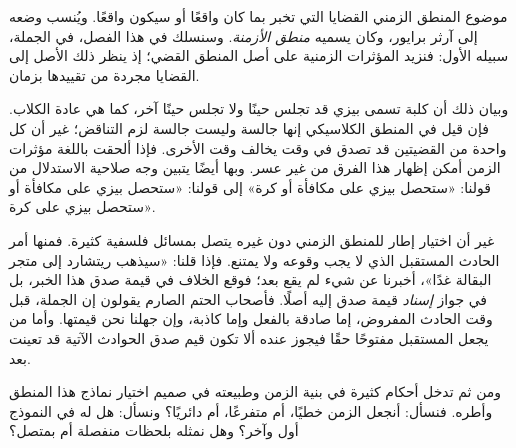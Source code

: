 \documentclass[../../../include/open-logic-section]{subfiles}
\begin{document}


موضوع المنطق الزمني القضايا التي تخبر بما كان واقعًا أو سيكون واقعًا. ويُنسب
وضعه إلى آرثر برايور، وكان يسميه \emph{منطق الأزمنة}. وسنسلك في هذا الفصل،
في الجملة، سبيله الأول: فنزيد المؤثرات الزمنية على أصل المنطق القضي؛ إذ
ينظر ذلك الأصل إلى القضايا مجردة من تقييدها بزمان.

وبيان ذلك أن كلبة تسمى بيزي قد تجلس حينًا ولا تجلس حينًا آخر، كما هي عادة
الكلاب. فإن قيل في المنطق الكلاسيكي إنها جالسة وليست جالسة لزم التناقض؛
غير أن كل واحدة من القضيتين قد تصدق في وقت يخالف وقت الأخرى. فإذا ألحقت
باللغة مؤثرات الزمن أمكن إظهار هذا الفرق من غير عسر. وبها أيضًا يتبين وجه
صلاحية الاستدلال من قولنا: «ستحصل بيزي على مكافأة أو كرة» إلى قولنا:
«ستحصل بيزي على مكافأة أو ستحصل بيزي على كرة».

غير أن اختيار إطار للمنطق الزمني دون غيره يتصل بمسائل فلسفية كثيرة. فمنها
أمر الحادث المستقبل الذي لا يجب وقوعه ولا يمتنع. فإذا قلنا: «سيذهب ريتشارد
إلى متجر البقالة غدًا»، أخبرنا عن شيء لم يقع بعد؛ فوقع الخلاف في قيمة صدق
هذا الخبر، بل في جواز \emph{إسناد} قيمة صدق إليه أصلًا. فأصحاب الحتم الصارم
يقولون إن الجملة، قبل وقت الحادث المفروض، إما صادقة بالفعل وإما كاذبة، وإن
جهلنا نحن قيمتها. وأما من يجعل المستقبل مفتوحًا حقًا فيجوز عنده ألا تكون
قيم صدق الحوادث الآتية قد تعينت بعد.

ومن ثم تدخل أحكام كثيرة في بنية الزمن وطبيعته في صميم اختيار نماذج هذا
المنطق وأطره. فنسأل: أنجعل الزمن خطيًا، أم متفرعًا، أم دائريًا؟ ونسأل: هل
له في النموذج أول وآخر؟ وهل نمثله بلحظات منفصلة أم بمتصل؟
\end{document}
